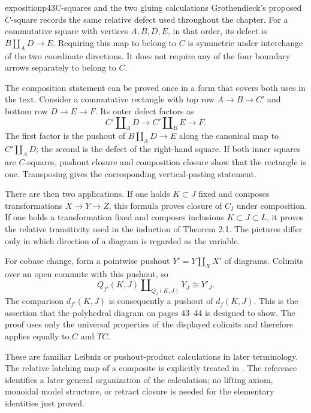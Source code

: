 \begin{dcomment}{exposition}{p43}{C-squares and the two gluing calculations}
Grothendieck's proposed $C$-square records the same relative defect used throughout the chapter. For a commutative square with vertices $A,B,D,E$, in that order, its defect is $B\amalg_A D\to E$. Requiring this map to belong to $C$ is symmetric under interchange of the two coordinate directions. It does not require any of the four boundary arrows separately to belong to $C$.

The composition statement can be proved once in a form that covers both uses in the text. Consider a commutative rectangle with top row $A\to B\to C'$ and bottom row $D\to E\to F$. Its outer defect factors as
\[
 C'\amalg_A D\longrightarrow C'\amalg_B E\longrightarrow F.
\]
The first factor is the pushout of $B\amalg_A D\to E$ along the canonical map to $C'\amalg_A D$; the second is the defect of the right-hand square. If both inner squares are $C$-squares, pushout closure and composition closure show that the rectangle is one. Transposing gives the corresponding vertical-pasting statement.

There are then two applications. If one holds $K\subset J$ fixed and composes transformations $X\to Y\to Z$, this formula proves closure of $C_I$ under composition. If one holds a transformation fixed and composes inclusions $K\subset J\subset L$, it proves the relative transitivity used in the induction of Theorem 2.1. The pictures differ only in which direction of a diagram is regarded as the variable.

For cobase change, form a pointwise pushout $Y'=Y\amalg_X X'$ of diagrams. Colimits over an open commute with this pushout, so
\[
 Q_{f'}(K,J)\amalg_{Q_f(K,J)}Y_J\cong Y'_J.
\]
The comparison $d_{f'}(K,J)$ is consequently a pushout of $d_f(K,J)$. This is the assertion that the polyhedral diagram on pages 43--44 is designed to show. The proof uses only the universal properties of the displayed colimits and therefore applies equally to $C$ and $TC$.

These are familiar Leibniz or pushout-product calculations in later terminology. The relative latching map of a composite is explicitly treated in \citet[Observation 5.1 and Example 5.2]{RiehlVerity2014Reedy}. The reference identifies a later general organization of the calculation; no lifting axiom, monoidal model structure, or retract closure is needed for the elementary identities just proved.
\end{dcomment}

